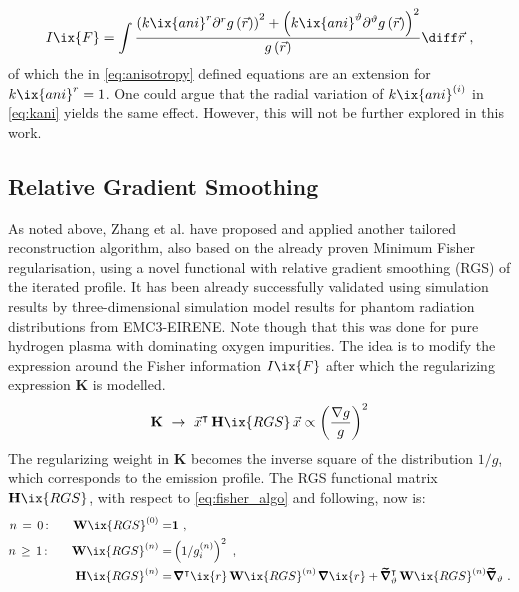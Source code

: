 %
            \begin{align}%
                I\ix{F}=\int\frac{%
                    \left(k\ix{ani}^{r}\partial^{r}g\left(\vec{r}\right)\right)^{2}+\left(k\ix{ani}^{\vartheta}\partial^{\vartheta}g\left(\vec{r}\right)\right)^{2}}{%
                    g\left(\vec{r}\right)}\diff\vec{r}\,\,,\nonumber%
            \end{align}%
%
            of which the in \cref{eq:anisotropy} defined equations are an extension for $k\ix{ani}^{r}=1$. One could argue that the radial variation of $k\ix{ani}^{\left(i\right)}$ in \cref{eq:kani} yields the same effect. However, this will not be further explored in this work.%
%
        \subsection{Relative Gradient Smoothing}\label{subsec:rgs}%
%
            As noted above, Zhang et al.\cite{Zhang2013,Zhang2021_2} have proposed and applied another tailored reconstruction algorithm, also based on the already proven\cite{Anton1996} Minimum Fisher regularisation, using a novel functional with relative gradient
            smoothing (RGS) of the iterated profile. It has been already successfully validated using simulation results by three-dimensional simulation model results for phantom radiation distributions from EMC3-EIRENE\cite{Zhang2021_2}. Note though that this was done for pure hydrogen plasma with dominating oxygen impurities. The idea is to modify the expression around the Fisher information $I\ix{F}$ after which the regularizing expression $\mathbf{K}$ is modelled.%
%
            \begin{align}%
                \mathbf{K}\,\,\to\,\,\vec{x}^{\intercal}\,\mathbf{H}\ix{RGS}\,\vec{x}\propto\left(\frac{\nabla g}{g}\right)^{2}%
            \end{align}\label{eq:baseRGS}%
%
            The regularizing weight in $\mathbf{K}$ becomes the inverse square of the distribution $1/g$, which corresponds to the emission profile. The RGS functional matrix $\mathbf{H}\ix{RGS}$, with respect to \cref{eq:fisher_algo} and following, now is:%
%
            \begin{align}%
                \begin{split}%
                    n\,=\,0\,\text{:}\qquad\mathbf{W}\ix{RGS}^{\left(0\right)}=&\mathbf{1}\,\,,\\%
                    n\,\ge\,1\,\text{:}\qquad\mathbf{W}\ix{RGS}^{\left(n\right)}=&\left(1/g_{i}^{\left(n\right)}\right)^{2}\,\,,\\
                    \mathbf{H}\ix{RGS}^{\left(n\right)}=&\,\pmb{\nabla}^{\intercal}\ix{r}\,\mathbf{W}\ix{RGS}^{\left(n\right)}\,\pmb{\nabla}\ix{r}+\pmb{\widetilde{\nabla}}^{\intercal}_{\vartheta}\,\mathbf{W}\ix{RGS}^{\left(n\right)}\pmb{\widetilde{\nabla}}_{\vartheta}\,\,.%
                \end{split}%
            \end{align}%
